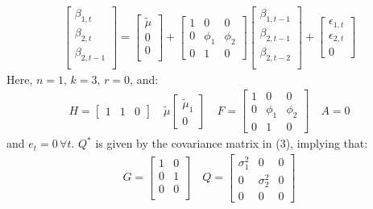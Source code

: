 \documentclass[10pt]{article}
\begin{document}
\begin{gather*}
    \begin{bmatrix}
        \beta_{1, t}\\
        \beta_{2, t}\\
        \beta_{2, t - 1}\\
    \end{bmatrix} = 
    \begin{bmatrix}
        \tilde{\mu}\\
        0 \\
        0 \\
    \end{bmatrix}
    + 
    \begin{bmatrix}
        1 & 0 & 0 \\ 
        0 & \phi_1 & \phi_2 \\ 
        0 & 1 & 0
    \end{bmatrix}
    \begin{bmatrix}
        \beta_{1, t - 1}\\
        \beta_{2, t -1}\\
        \beta_{2, t - 2}\\
    \end{bmatrix}
    + 
    \begin{bmatrix}
        \epsilon_{1, t}\\
        \epsilon_{2, t}\\
        0
    \end{bmatrix}
\end{gather*}
Here, $n = 1,\, k = 3,\, r = 0 $, and: 
\begin{gather*}
    H = \begin{bmatrix}
        1 & 1 & 0
    \end{bmatrix}
    \quad \tilde{\mu} \begin{bmatrix}
        \tilde{\mu}_1 \\ 0
    \end{bmatrix}
    \quad F = \begin{bmatrix}
        1 & 0 & 0 \\ 
        0 & \phi_1 & \phi_2 \\ 
        0 & 1 & 0
    \end{bmatrix}
    \quad A = 0
\end{gather*}
and $e_t = 0\, \forall t $. $Q^* $ is given by the covariance matrix in (3), implying that: 
\begin{gather*}
    G = \begin{bmatrix}
        1 & 0 \\
        0 & 1 \\
        0 & 0 \\
    \end{bmatrix}
    \quad Q = 
    \begin{bmatrix}
        \sigma^2_1 & 0 & 0 \\
        0 & \sigma^2_2 & 0 \\ 
        0 & 0 & 0 
    \end{bmatrix}
\end{gather*}
\end{document}
